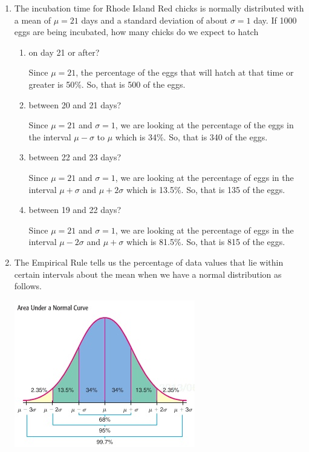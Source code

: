 \documentclass[11pt]{article}
\newcommand{\answer}[1]{\color{white}#1}
\begin{document}
\begin{enumerate}

\item The incubation time for Rhode Island Red chicks is normally distributed with a mean of $\mu = 21$ days and a standard deviation of about $\sigma =1$ day.  If 1000 eggs are being incubated, how many chicks do we expect to hatch

	\begin{enumerate}
	\item on day 21 or after?
	
	{\answer Since $\mu = 21$, the percentage of the eggs that will hatch at that time or greater is 50\%.  So, that is 500 of the eggs.}
	
	\item between 20 and 21 days? 
	
	{\answer Since $\mu = 21$ and $\sigma =1$, we are looking at the percentage of the eggs in the interval $\mu-\sigma$ to $\mu$ which is 34\%.  So, that is 340 of the eggs.}
	
	\item between 22 and 23 days?
	
	{\answer Since $\mu = 21$ and $\sigma=1$, we are looking at the percentage of eggs in the interval $\mu+\sigma$ and $\mu + 2\sigma$ which is 13.5\%.  So, that is 135 of the eggs.}
	
	\item between 19 and 22 days?
	
	{\answer Since $\mu = 21$ and $\sigma=1$, we are looking at the percentage of eggs in the interval $\mu-2\sigma$ and $\mu + \sigma$ which is 81.5\%.  So, that is 815 of the eggs.}
	
	\end{enumerate}

\item The Empirical Rule tells us the percentage of data values that lie within certain intervals about the mean when we have a normal distribution as follows.

\begin{center}
\includegraphics[scale=0.5]{WS10_NormalArea.jpg}
\end{center}


\end{enumerate}
\end{document}

